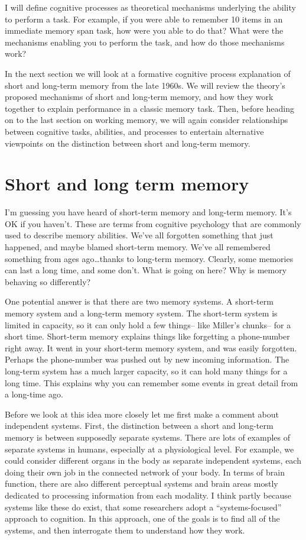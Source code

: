 \documentclass[
  oneside,
  12pt]{crumpbook}
\begin{document}
I will define cognitive processes as theoretical mechanisms underlying the ability to perform a task. For example, if you were able to remember 10 items in an immediate memory span task, how were you able to do that? What were the mechanisms enabling you to perform the task, and how do those mechanisms work?

In the next section we will look at a formative cognitive process explanation of short and long-term memory from the late 1960s. We will review the theory's proposed mechanisms of short and long-term memory, and how they work together to explain performance in a classic memory task. Then, before heading on to the last section on working memory, we will again consider relationships between cognitive tasks, abilities, and processes to entertain alternative viewpoints on the distinction between short and long-term memory.

\hypertarget{short-and-long-term-memory}{%
\section{Short and long term memory}\label{short-and-long-term-memory}}

I'm guessing you have heard of short-term memory and long-term memory. It's OK if you haven't. These are terms from cognitive psychology that are commonly used to describe memory abilities. We've all forgotten something that just happened, and maybe blamed short-term memory. We've all remembered something from ages ago\ldots thanks to long-term memory. Clearly, some memories can last a long time, and some don't. What is going on here? Why is memory behaving so differently?

One potential answer is that there are two memory systems. A short-term memory system and a long-term memory system. The short-term system is limited in capacity, so it can only hold a few things-- like Miller's chunks-- for a short time. Short-term memory explains things like forgetting a phone-number right away. It went in your short-term memory system, and was easily forgotten. Perhaps the phone-number was pushed out by new incoming information. The long-term system has a much larger capacity, so it can hold many things for a long time. This explains why you can remember some events in great detail from a long-time ago.

Before we look at this idea more closely let me first make a comment about independent systems. First, the distinction between a short and long-term memory is between supposedly separate systems. There are lots of examples of separate systems in humans, especially at a physiological level. For example, we could consider different organs in the body as separate independent systems, each doing their own job in the connected network of your body. In terms of brain function, there are also different perceptual systems and brain areas mostly dedicated to processing information from each modality. I think partly because systems like these do exist, that some researchers adopt a ``systems-focused'' approach to cognition. In this approach, one of the goals is to find all of the systems, and then interrogate them to understand how they work.
\end{document}
